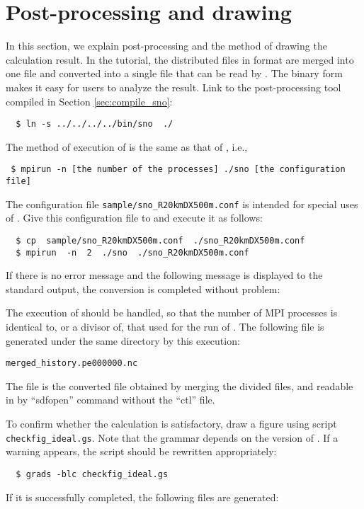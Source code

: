 \section{Post-processing and drawing} \label{sec:ideal_exp_sno}
In this section, we explain post-processing and the method of drawing the calculation result.
In the tutorial, the distributed files in \netcdf format are merged into one file
and converted into a single \netcdf file that can be read by {\grads}.
The binary form makes it easy for users to analyze the result.
Link to the post-processing tool \sno compiled in Section \ref{sec:compile_sno}:
\begin{verbatim}
  $ ln -s ../../../../bin/sno  ./
\end{verbatim}

The method of execution of \sno is the same as that of \scalerm, i.e.,
\begin{verbatim}
 $ mpirun -n [the number of the processes] ./sno [the configuration file]
\end{verbatim}
The configuration file \verb|sample/sno_R20kmDX500m.conf| is intended for special uses of \sno.
Give this configuration file to \sno and execute it as follows:
\begin{verbatim}
  $ cp  sample/sno_R20kmDX500m.conf  ./sno_R20kmDX500m.conf
  $ mpirun  -n  2  ./sno  ./sno_R20kmDX500m.conf
\end{verbatim}
If there is no error message and the following message is displayed to the standard output,
the conversion is completed without problem:

The execution of \sno should be handled,
so that the number of MPI processes is identical to, or a divisor of, that used for the run of \scalerm.
The following file is generated under the same directory by this execution:
\begin{alltt}
  merged_history.pe000000.nc
\end{alltt}
The \netcdf file is the converted file obtained by merging the divided files,
and readable in \grads by ``sdfopen'' command without the ``ctl'' file.

To confirm whether the calculation is satisfactory,
draw a figure using \grads script \verb|checkfig_ideal.gs|.
Note that the grammar depends on the version of \grads.
If a warning appears, the \grads script should be rewritten appropriately:
\begin{verbatim}
  $ grads -blc checkfig_ideal.gs
\end{verbatim}
If it is successfully completed, the following files are generated:


